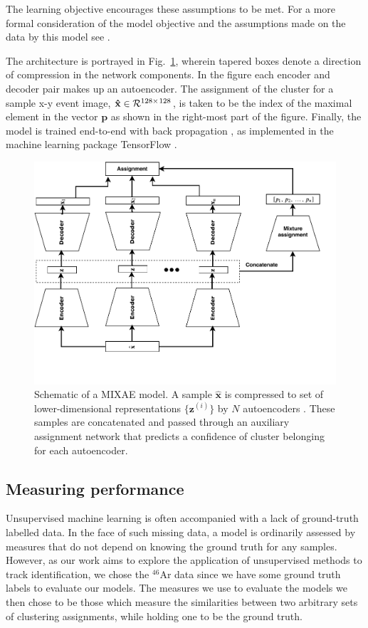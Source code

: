 \documentclass[preprint,12pt]{elsarticle}
\begin{document}
The learning objective encourages these assumptions to be met. For a more formal consideration of the model objective and the assumptions made on the data by this model see \citet{Zhang}.

The architecture is portrayed in Fig.~\ref{fig:mixae}, wherein tapered boxes denote a direction of compression in the network components. In the figure each encoder and decoder pair makes up an autoencoder. The assignment of the cluster for a sample x-y event image, $\mathbf{\hat{x}} \in \mathcal{R}^{128 \times \hspace{0.01in} 128} $, is taken to be the index of the maximal element in the vector $\mathbf{p}$ as shown in the right-most part of the figure. Finally, the model is trained end-to-end with back propagation \cite{Linnainmaa1976}, as implemented in the machine learning package TensorFlow \cite{tensorflow}.


\begin{figure}[tbh]
	\centering
	\includegraphics[width=.8\textwidth]{plots/mixae.pdf}
	\caption[Mixture of autoencoders schematic]{Schematic of a MIXAE model. A sample $\hat{\boldsymbol{x}}$ is compressed to set of lower-dimensional representations $\{\boldsymbol{z}^{(i)}\}$ by $N$ autoencoders \cite{Zhang}. These samples are concatenated and passed through an auxiliary assignment network that predicts a confidence of cluster belonging for each autoencoder.}
	\label{fig:mixae}
\end{figure}


\subsection{Measuring performance}
Unsupervised machine learning  is often accompanied with a  lack of ground-truth labelled data. In the face of such missing data, a model is ordinarily assessed by measures that do not depend on knowing the ground truth for any samples. 
However, as our work aims to explore the application of unsupervised methods to track identification, we chose the ${}^{46}$Ar data since we have some ground truth labels to evaluate our models. The measures we use to evaluate the models we then chose to be those which measure the similarities between two arbitrary sets of clustering assignments, while holding one to be the ground truth. 
\end{document}

